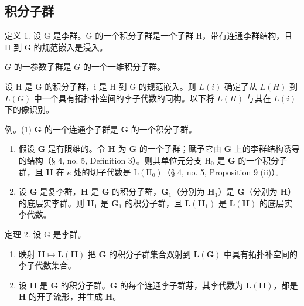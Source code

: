\subsection{积分子群}

定义 1. 设 G 是李群。G 的一个积分子群是一个子群 H，带有连通李群结构，且 H 到 G 的规范嵌入是浸入。

\(G\) 的一参数子群是 \(G\) 的一个一维积分子群。

设 H 是 G 的积分子群，i 是 H 到 G 的规范嵌入。则 \(L(i)\) 确定了从 \(L(H)\) 到 \(L(G)\) 中一个具有拓扑补空间的李子代数的同构。以下将 \(L(H)\) 与其在 \(L(i)\) 下的像识别。

例。(1) \(\mathbf{G}\) 的一个连通李子群是 \(\mathbf{G}\) 的一个积分子群。

\begin{enumerate}
\def\labelenumi{(\arabic{enumi})}
\setcounter{enumi}{1}
\item
  假设 \(\mathbf{G}\) 是有限维的。令 \(\mathbf{H}\) 为 \(\mathbf{G}\) 的一个子群；赋予它由 \(\mathbf{G}\) 上的李群结构诱导的结构（§ 4, no. 5, Definition 3）。则其单位元分支 \(\mathrm{H}_0\) 是 \(\mathbf{G}\) 的一个积分子群，且 \(\mathbf{H}\) 在 \(e\) 处的切子代数是 \(\mathrm{L}(\mathrm{H}_0)\)（§ 4, no. 5, Proposition 9 (ii)）。
\item
  设 \(\mathbf{G}\) 是复李群，\(\mathbf{H}\) 是 \(\mathbf{G}\) 的积分子群，\(\mathbf{G}_1\)（分别为 \(\mathbf{H}_1\)）是 \(\mathbf{G}\)（分别为 \(\mathbf{H}\)）的底层实李群。则 \(\mathbf{H}_1\) 是 \(\mathbf{G}_1\) 的积分子群，且 \(\mathbf{L}(\mathbf{H}_1)\) 是 \(\mathbf{L}(\mathbf{H})\) 的底层实李代数。
\end{enumerate}

定理 2. 设 G 是李群。

\begin{enumerate}
\def\labelenumi{(\roman{enumi})}
\item
  映射 \(\mathbf{H} \mapsto \mathbf{L}(\mathbf{H})\) 把 \(\mathbf{G}\) 的积分子群集合双射到 \(\mathbf{L}(\mathbf{G})\) 中具有拓扑补空间的李子代数集合。
\item
  设 \(\mathbf{H}\) 是 \(\mathbf{G}\) 的积分子群。\(\mathbf{G}\) 的每个连通李子群芽，其李代数为 \(\mathbf{L}(\mathbf{H})\)，都是 \(\mathbf{H}\) 的开子流形，并生成 \(\mathbf{H}\)。
\end{enumerate}

